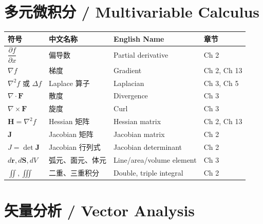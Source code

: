 \section{多元微积分 / Multivariable Calculus}

\begin{center}
\renewcommand{\arraystretch}{1.25}
\begin{tabular}{@{}llll@{}}
\toprule
\textbf{符号} & \textbf{中文名称} & \textbf{English Name} & \textbf{章节} \\
\midrule
$\dfrac{\partial f}{\partial x}$ & 偏导数 & Partial derivative & Ch 2 \\
$\nabla f$ & 梯度 & Gradient & Ch 2, Ch 13 \\
$\nabla^2 f$ 或 $\Delta f$ & Laplace 算子 & Laplacian & Ch 3, Ch 5 \\
$\nabla \cdot \mathbf{F}$ & 散度 & Divergence & Ch 3 \\
$\nabla \times \mathbf{F}$ & 旋度 & Curl & Ch 3 \\
$\mathbf{H} = \nabla^2 f$ & Hessian 矩阵 & Hessian matrix & Ch 2, Ch 13 \\
$\mathbf{J}$ & Jacobian 矩阵 & Jacobian matrix & Ch 2 \\
$J = \det \mathbf{J}$ & Jacobian 行列式 & Jacobian determinant & Ch 2 \\
$d\mathbf{r}, d\mathbf{S}, dV$ & 弧元、面元、体元 & Line/area/volume element & Ch 3 \\
$\iint, \iiint$ & 二重、三重积分 & Double, triple integral & Ch 2 \\
\bottomrule
\end{tabular}
\end{center}

\section{矢量分析 / Vector Analysis}

